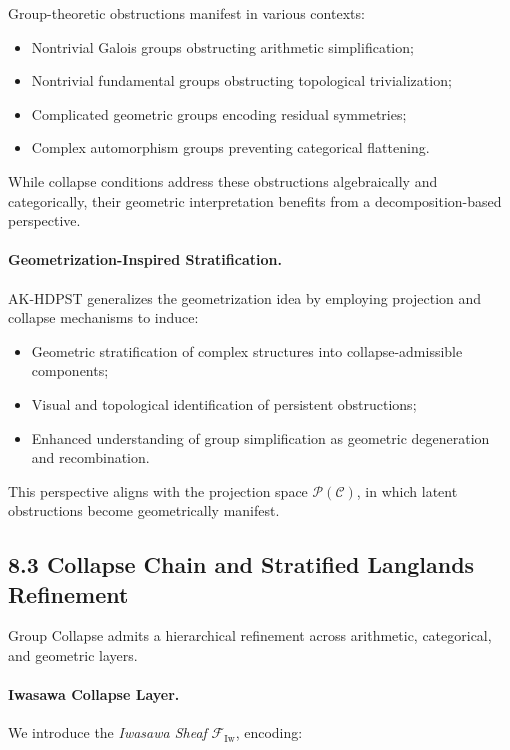 \documentclass[11pt]{article}
\begin{document}
Group-theoretic obstructions manifest in various contexts:

\begin{itemize}
    \item Nontrivial Galois groups obstructing arithmetic simplification;
    \item Nontrivial fundamental groups obstructing topological trivialization;
    \item Complicated geometric groups encoding residual symmetries;
    \item Complex automorphism groups preventing categorical flattening.
\end{itemize}

While collapse conditions address these obstructions algebraically and categorically, their geometric interpretation benefits from a decomposition-based perspective.

\paragraph{Geometrization-Inspired Stratification.}
AK-HDPST generalizes the geometrization idea by employing projection and collapse mechanisms to induce:

\begin{itemize}
    \item Geometric stratification of complex structures into collapse-admissible components;
    \item Visual and topological identification of persistent obstructions;
    \item Enhanced understanding of group simplification as geometric degeneration and recombination.
\end{itemize}

This perspective aligns with the projection space \( \mathcal{P}(\mathcal{C}) \), in which latent obstructions become geometrically manifest.

\subsection*{8.3 Collapse Chain and Stratified Langlands Refinement}

Group Collapse admits a hierarchical refinement across arithmetic, categorical, and geometric layers.

\paragraph{Iwasawa Collapse Layer.}
We introduce the \emph{Iwasawa Sheaf} \( \mathcal{F}_{\mathrm{Iw}} \), encoding:
\end{document}
